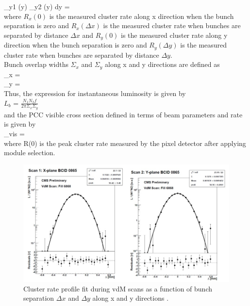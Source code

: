 \int \rho_{y1} (y) \rho_{y2} (y) dy =  \\

where $R_x(0)$ is the measured cluster rate along x direction when the bunch separation is zero and $R_x(\Delta x)$ is the measured cluster rate when bunches are separated by distance $\Delta x$ and $R_y(0)$ is the measured cluster rate along y direction when the bunch separation is zero and $R_y(\Delta y)$ is the measured cluster rate when bunches are separated by distance $\Delta y$. \\

Bunch overlap widths $\Sigma_x$ and $\Sigma_y$ along x and y directions are defined as \\

\Sigma_x =   \\

\Sigma_y =    \\

Thus, the expression for instantaneous luminosity is given by \\

$L_{b}$ = $\frac{N_1 N_2 f}{2\pi \Sigma_x \Sigma_y}$ \\

and the PCC visible cross section defined in terms of beam parameters and rate is given by \\

\sigma_{vis} =  \\

where R(0) is the peak cluster rate measured by the pixel detector after applying module selection.\\



\begin{figure}[H]
  \centering
  \includegraphics[width=0.7\columnwidth]{./cropped.jpg}
  \caption{ \onehalfspacing Cluster rate profile fit during vdM scans as a function of bunch separation $\Delta x$ and $\Delta y$ along x and y directions \cite{CMS-PAS-LUM-15-001}.}
  \label{fig:CMS}
\end{figure}








